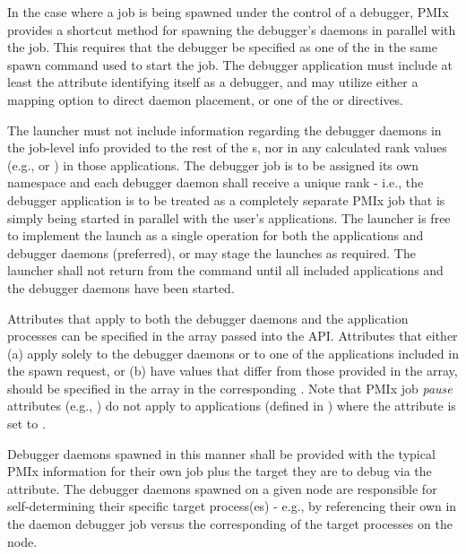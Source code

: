 In the case where a job is being spawned under the control of a debugger, \ac{PMIx} provides a shortcut method for spawning the debugger's daemons in parallel with the job. This requires that the debugger be specified as one of the  in the same spawn command used to start the job. The debugger application must include at least the  attribute identifying itself as a debugger, and may utilize either a mapping option to direct daemon placement, or one of the  or  directives.

The launcher must not include information regarding the debugger daemons in
the job-level info
provided to the rest of the s, nor in any calculated rank
values (e.g.,  or ) in those applications. The
debugger job is to be assigned its own namespace and each debugger daemon shall
receive a unique rank - i.e., the debugger application is to be treated as a
completely separate \ac{PMIx} job that is simply being started in parallel with
the user's applications. The launcher is free to implement the launch as a
single operation for both the applications and debugger daemons (preferred), or
may stage the launches as required. The launcher shall not return from the
 command until all included applications and the debugger
daemons have been started.

Attributes that apply to both the debugger daemons and the application processes can
be specified in the  array passed into the
 \ac{API}. Attributes that either (a) apply solely to the
debugger daemons or to one of the applications included in the spawn request,
or (b) have values that differ from those provided in the 
array, should be specified in the  array in the corresponding
.
Note that \ac{PMIx} job \emph{pause} attributes (e.g., ) do not apply to applications (defined in ) where the  attribute is set to .

Debugger daemons spawned in this manner shall be provided with the typical
\ac{PMIx} information for their own job plus the target they are to debug via
the  attribute. The debugger daemons spawned on a
given node are responsible for self-determining their specific target
process(es) - e.g., by referencing their own  in the
daemon debugger job versus the corresponding  of the
target processes on the node.

